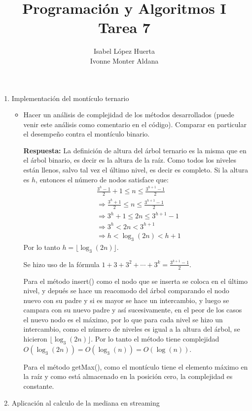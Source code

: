 \documentclass[11pt]{article}
\title{Programación y Algoritmos I \\Tarea 7}
\author{Isabel López Huerta\\Ivonne Monter Aldana}
\begin{document}
\maketitle
\begin{enumerate}
\item Implementación del montículo ternario
\begin{itemize}
 \item Hacer un análisis de complejidad de los métodos desarrollados (puede venir este análisis como comentario en el código). Comparar en particular el desempeño contra el montículo binario.
 
 \textbf{Respuesta:}
La definición de altura del árbol ternario es la misma que en el árbol binario, es decir es la altura de la raíz. 
Como todos los niveles están llenos, salvo tal vez el último nivel, es decir es completo. Si la altura es $h$, entonces el número de nodos satisface que:
\begin{align*}
&\frac{3^{h}-1}{2}+1\leq n \leq \frac{3^{h+1}-1}{2}\\
&\Rightarrow\frac{3^{h}+1}{2}\leq n \leq \frac{3^{h+1}-1}{2}\\
&\Rightarrow 3^{h}+1\leq 2n \leq 3^{h+1}-1\\
&\Rightarrow 3^{h}< 2n < 3^{h+1}\\
&\Rightarrow h< \log_3(2n) < h+1
\end{align*} 
Por lo tanto $h= \lfloor\log_3(2n)\rfloor$.

Se hizo uso de la fórmula  $1+3+3^2+\cdots +3^k=\frac{3^{k+1}-1}{2}$.

Para el método insert() como el nodo que se inserta se coloca en el último nivel, y depués se hace un reacomodo del árbol comparando el nodo nuevo con su padre y si es mayor se hace un intercambio, y luego se campara con su nuevo padre y así sucesivamente, en el peor de los casos el nuevo nodo es el máximo, por lo que para cada nivel se hizo un intercambio, como el número de niveles es igual a la altura del árbol, se hicieron $\lfloor\log_3(2n)\rfloor$. Por lo tanto el método tiene complejidad $O(\log_3(2n))=O(\log_3(n))=O(\log(n))$.


Para el método getMax(), como el montículo tiene el elemento máximo en la raíz y como está almacenado en la posición cero, la complejidad es constante.
 

\end{itemize}
\item Aplicación al calculo de la mediana en streaming

\end{enumerate}
\end{document}
